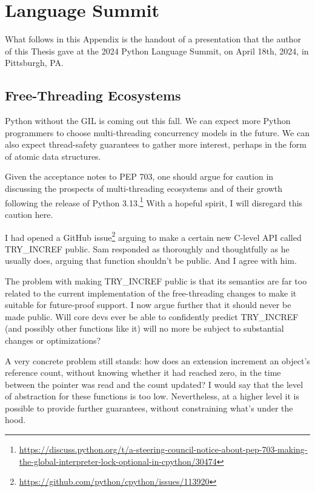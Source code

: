 \chapter{Language Summit}\label{ch:language-summit}

What follows in this Appendix is the handout of a presentation that the author of this Thesis gave at the 2024 Python Language Summit, on April 18th, 2024, in Pittsburgh, PA\@.


\section{Free-Threading Ecosystems}\label{sec:free-threading-ecosystems}

Python without the GIL is coming out this fall.
We can expect more Python programmers to choose multi-threading concurrency models in the future.
We can also expect thread-safety guarantees to gather more interest, perhaps in the form of atomic data structures.

Given the acceptance notes to PEP 703, one should argue for caution in discussing the prospects of multi-threading ecosystems and of their growth following the release of Python 3.13.\footnote{%
    \url{https://discuss.python.org/t/a-steering-council-notice-about-pep-703-making-the-global-interpreter-lock-optional-in-cpython/30474}
}
With a hopeful spirit, I will disregard this caution here.

I had opened a GitHub issue\footnote{%
    \url{https://github.com/python/cpython/issues/113920}
} arguing to make a certain new C-level API called TRY\_INCREF public.
Sam responded as thoroughly and thoughtfully as he usually does, arguing that function shouldn't be public.
And I agree with him.

The problem with making TRY\_INCREF public is that its semantics are far too related to the current implementation of the free-threading changes to make it suitable for future-proof support.
I now argue further that it should never be made public.
Will core devs ever be able to confidently predict TRY\_INCREF (and possibly other functions like it) will no more be subject to substantial changes or optimizations?

A very concrete problem still stands:  how does an extension increment an object's reference count, without knowing whether it had reached zero, in the time between the pointer was read and the count updated?
I would say that the level of abstraction for these functions is too low.
Nevertheless, at a higher level it is possible to provide further guarantees, without constraining what's under the hood.

